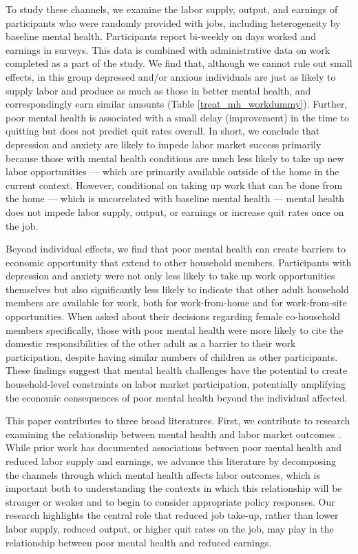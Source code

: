 \documentclass[12pt, a4paper, american]{article}
\begin{document}
To study these channels, we examine the labor supply, output, and earnings of participants who were randomly provided with jobs, including heterogeneity by baseline mental health. Participants report bi-weekly on days worked and earnings in surveys. This data is combined with administrative data on work completed as a part of the study. We find that, although we cannot rule out small effects, in this group depressed and/or anxious individuals are just as likely to supply labor and produce as much as those in better mental health, and correspondingly earn similar amounts (Table \ref{treat_mh_workdummy}). Further, poor mental health is associated with a small delay (improvement) in the time to quitting but does not predict quit rates overall. In short, we conclude that depression and anxiety are likely to impede labor market success primarily because those with mental health conditions are much less likely to take up new labor opportunities --- which are primarily available outside of the home in the current context. However, conditional on taking up work that can be done from the home --- which is uncorrelated with baseline mental health --- mental health does not impede labor supply, output, or earnings or increase quit rates once on the job. 


Beyond individual effects, we find that poor mental health can create barriers to economic opportunity that extend to other household members. Participants with depression and anxiety were not only less likely to take up work opportunities themselves but also significantly less likely to indicate that other adult household members are available for work, both for work-from-home and for work-from-site opportunities. When asked about their decisions regarding female co-household members specifically, those with poor mental health were more likely to cite the domestic responsibilities of the other adult as a barrier to their work participation, despite having similar numbers of children as other participants. These findings suggest that mental health challenges have the potential to create household-level constraints on labor market participation, potentially amplifying the economic consequences of poor mental health beyond the individual affected.

This paper contributes to three broad literatures. First, we contribute to research examining the relationship between mental health and labor market outcomes \citep{ridley_poverty_2020, hakulinen_mental_2019, biasi_career_2021}. While prior work has documented associations between poor mental health and reduced labor supply and earnings, we advance this literature by decomposing the channels through which mental health affects labor outcomes, which is important both to understanding the contexts in which this relationship will be stronger or weaker and to begin to consider appropriate policy responses. Our research highlights the central role that reduced job take-up, rather than lower labor supply, reduced output, or higher quit rates on the job, may play in the relationship between poor mental health and reduced earnings. 
\end{document}
